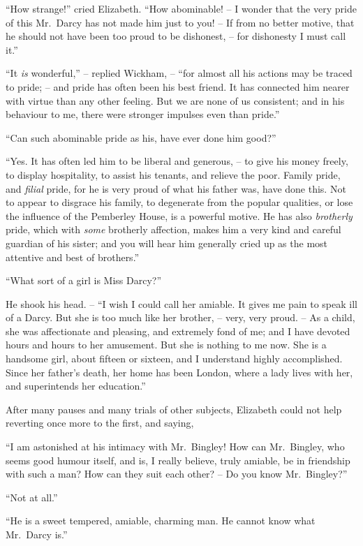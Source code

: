 “How strange!” cried Elizabeth. “How abominable! -- I
wonder that the very pride of this Mr.\ Darcy
has not made him just to you! -- If from no better motive,
that he should not have been too proud to be dishonest, -- for
dishonesty I must call it.”

“It \textit{is} wonderful,” -- replied Wickham, -- “for almost
all his actions may be traced to pride; -- and pride has
often been his best friend. It has connected him nearer
with virtue than any other feeling. But we are none of
us consistent; and in his behaviour to me, there were
stronger impulses even than pride.”

“Can such abominable pride as his, have ever done
him good?”

“Yes. It has often led him to be liberal and generous, -- to
give his money freely, to display hospitality, to assist
his tenants, and relieve the poor. Family pride, and \textit{filial}
pride, for he is very proud of what his father was, have
done this. Not to appear to disgrace his family, to degenerate
from the popular qualities, or lose the influence of the
Pemberley House, is a powerful motive. He has also
\textit{brotherly} pride, which with \textit{some} brotherly affection, makes
him a very kind and careful guardian of his sister; and you
will hear him generally cried up as the most attentive and
best of brothers.”

“What sort of a girl is Miss Darcy?”

He shook his head. -- “I wish I could call her amiable.
It gives me pain to speak ill of a Darcy. But she is too
much like her brother, -- very, very proud. -- As a child,
she was affectionate and pleasing, and extremely fond of
me; and I have devoted hours and hours to her amusement.
But she is nothing to me now. She is a handsome
girl, about fifteen or sixteen, and I understand highly
accomplished. Since her father’s death, her home has
been London, where a lady lives with her, and superintends
her education.”

After many pauses and many trials of other subjects,
Elizabeth could not help reverting once more to the first,
and saying,

“I am astonished at his intimacy with Mr.\ Bingley!
How can Mr.\ Bingley, who seems good humour itself, and
is, I really believe, truly amiable, be in friendship with
such a man? How can they suit each other? -- Do you
know Mr.\ Bingley?”

“Not at all.”

“He is a sweet tempered, amiable, charming man.
He cannot know what Mr.\ Darcy is.”


